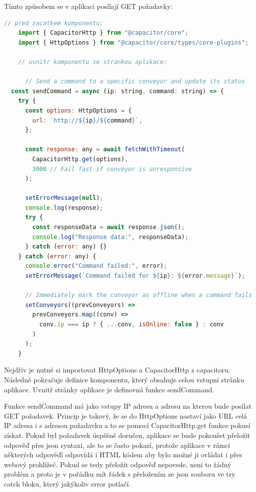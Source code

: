 Tímto způsobem se v aplikaci posílají GET požadavky:
\begin{lstlisting}[language=JavaScript, caption={Funkce sendCommand dostupná uvnitř vstupní stránky aplikace}, label={lst:SendCommandFunkce}]
    // pred zacatkem komponentu:
    import { CapacitorHttp } from "@capacitor/core";
    import { HttpOptions } from "@capacitor/core/types/core-plugins";

    // uvnitr komponentu se strankou aplikace:

      // Send a command to a specific conveyor and update its status
  const sendCommand = async (ip: string, command: string) => {
    try {
      const options: HttpOptions = {
        url: `http://${ip}/${command}`,
      };

      const response: any = await fetchWithTimeout(
        CapacitorHttp.get(options),
        3000 // Fail fast if conveyor is unresponsive
      );

      setErrorMessage(null);
      console.log(response);
      try {
        const responseData = await response.json();
        console.log("Response data:", responseData);
      } catch (error: any) {}
    } catch (error: any) {
      console.error("Command failed:", error);
      setErrorMessage(`Command failed for ${ip}: ${error.message}`);

      // Immediately mark the conveyor as offline when a command fails
      setConveyors((prevConveyors) =>
        prevConveyors.map((conv) =>
          conv.ip === ip ? { ...conv, isOnline: false } : conv
        )
      );
    }
\end{lstlisting}
Nejdřív je nutné si importovat HttpOptions a CapacitorHttp z capacitoru. Následně pokračuje definice komponentu, který obsahuje celou vstupní stránku aplikace. Uvnitř stránky aplikace je definovná funkce sendCommand.

Funkce sendCommand má jako vstupy IP adresu a adresu na kterou bude posílat GET požadavek. Princip je takový, že se do HttpOptions nastaví jako URL celá IP adresa i s adresou požadavku a to se pomocí CapacitorHttp.get funkce pokusí získat. Pokud byl požadavek úspěšně doručen, aplikace se bude pokoušet přeložit odpověď přes json syntaxi, ale to se často pokazí, protože aplikace v rámci některých odpověďí odpovídá i HTML kódem aby bylo možné ji ovládat i přes webový prohlížeč. Pokud se tedy přeložit odpověď nepovede, není to žádný problém a proto je v pořádku mít řádek s přeložením ze json souboru ve try catch bloku, který jakýkoliv error potlačí.

